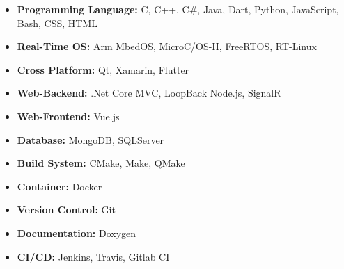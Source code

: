 \documentclass[letterpaper,10pt]{article}
\begin{document}
\begin{itemize}

\item {\bf Programming Language:} C, C++, C\#, Java, Dart, Python, JavaScript, Bash, CSS, HTML
\item {\bf Real-Time OS: } Arm MbedOS, MicroC/OS-II, FreeRTOS, RT-Linux
\item {\bf Cross Platform: } Qt, Xamarin, Flutter
\item {\bf Web-Backend: } .Net Core MVC, LoopBack Node.js, SignalR
\item {\bf Web-Frontend: } Vue.js
\item {\bf Database: } MongoDB, SQLServer
\item {\bf Build System: } CMake, Make, QMake
\item {\bf Container: } Docker
\item {\bf Version Control: } Git
\item {\bf Documentation: } Doxygen
\item {\bf CI/CD: } Jenkins, Travis, Gitlab CI

\end{itemize}
\end{document}

